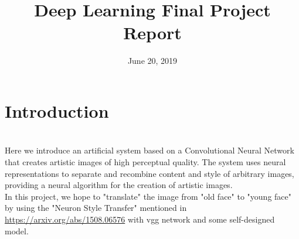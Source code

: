 \documentclass[11pt, a4paper]{article} %
\title{Deep Learning Final Project Report} %
\begin{document}


\date{June 20, 2019}

\maketitle{} %

\setcounter{page}{1} %

\section{Introduction} %
\\ Here we introduce an
artificial system based on a Convolutional Neural Network that creates artistic images
of high perceptual quality. The system uses neural representations to separate and recombine content and style of arbitrary images, providing a neural
algorithm for the creation of artistic images. 
\\ In this project, we hope to "translate" the image from "old face" to "young face" by using the "Neuron Style Transfer" mentioned in \url{https://arxiv.org/abs/1508.06576} with vgg network and some self-designed model.
\end{document}
